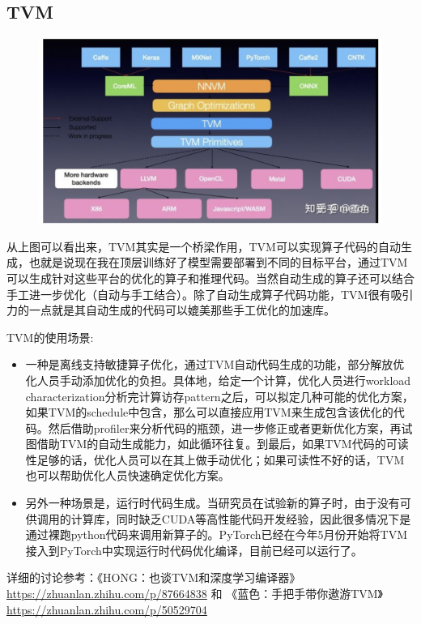 \documentclass[12pt]{article}
\begin{document}
\subsection{TVM}
\begin{figure}[H]
    \centering
    \includegraphics[width=1\textwidth]{fig/Deep_Learning_Speed_Up_TVM.png}
\end{figure}

从上图可以看出来，TVM其实是一个桥梁作用，TVM可以实现算子代码的自动生成，也就是说现在我在顶层训练好了模型需要部署到不同的目标平台，通过TVM可以生成针对这些平台的优化的算子和推理代码。当然自动生成的算子还可以结合手工进一步优化（自动与手工结合）。除了自动生成算子代码功能，TVM很有吸引力的一点就是其自动生成的代码可以媲美那些手工优化的加速库。

TVM的使用场景:
\begin{itemize}
\setlength{\itemsep}{0pt}
\setlength{\parsep}{0pt}
\setlength{\parskip}{0pt}
    \item 一种是离线支持敏捷算子优化，通过TVM自动代码生成的功能，部分解放优化人员手动添加优化的负担。具体地，给定一个计算，优化人员进行workload characterization分析完计算访存pattern之后，可以拟定几种可能的优化方案，如果TVM的schedule中包含，那么可以直接应用TVM来生成包含该优化的代码。然后借助profiler来分析代码的瓶颈，进一步修正或者更新优化方案，再试图借助TVM的自动生成能力，如此循环往复。到最后，如果TVM代码的可读性足够的话，优化人员可以在其上做手动优化；如果可读性不好的话，TVM也可以帮助优化人员快速确定优化方案。

    \item 另外一种场景是，运行时代码生成。当研究员在试验新的算子时，由于没有可供调用的计算库，同时缺乏CUDA等高性能代码开发经验，因此很多情况下是通过裸跑python代码来调用新算子的。PyTorch已经在今年5月份开始将TVM接入到PyTorch中实现运行时代码优化编译，目前已经可以运行了。
\end{itemize}
详细的讨论参考：《HONG：也谈TVM和深度学习编译器》\url{https://zhuanlan.zhihu.com/p/87664838} 和 《蓝色：手把手带你遨游TVM》 \url{https://zhuanlan.zhihu.com/p/50529704}
\end{document}
